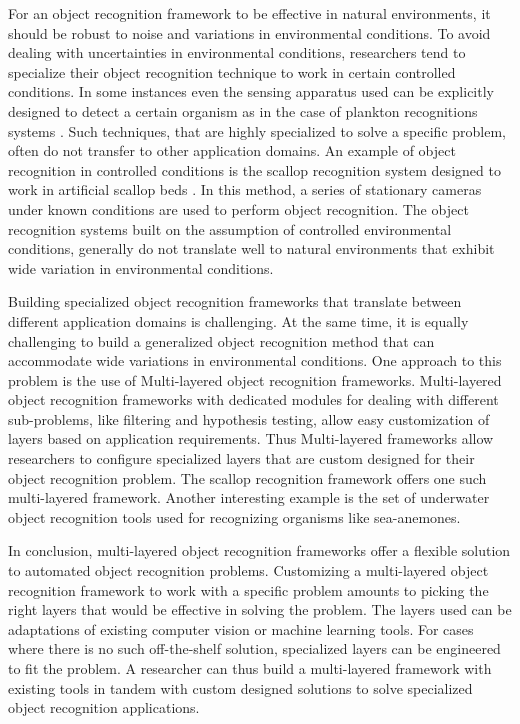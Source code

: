 \documentclass {udthesis}
\begin{document}
For an object recognition framework to be effective in natural environments, it
should be robust to noise and variations in environmental conditions. 
To avoid dealing with uncertainties in environmental conditions, researchers tend to specialize their object recognition technique to work in certain controlled conditions. In some instances even the sensing apparatus used can be explicitly designed to detect a certain organism as in the case of plankton 
recognitions systems \cite{mcgavin_plankton, stelzer_rotifier}. 
Such techniques, that are highly specialized to solve a specific problem, 
often do not transfer to other application domains. An example of object recognition in controlled conditions is the scallop recognition system designed to work in artificial scallop beds \cite{enomoto9,enomoto10}. In this method, a series of stationary cameras under known conditions are used to perform object recognition. The object recognition systems built on the assumption of controlled environmental conditions, generally do not translate well to natural environments that exhibit wide variation in environmental conditions.

Building specialized object recognition frameworks that translate between different application domains is challenging. 
At the same time, it is equally challenging to build a generalized object recognition method that can accommodate wide variations in environmental conditions. 
One approach to this problem is the use of Multi-layered object recognition frameworks. Multi-layered object recognition frameworks with dedicated modules for dealing with different sub-problems, like filtering and hypothesis testing, allow easy customization of layers based on application requirements. 
Thus Multi-layered frameworks allow researchers to configure specialized layers that are custom designed for their object recognition problem. The scallop
recognition framework \cite{prasanna_aslo, prasanna_igi} offers one such multi-layered framework. Another interesting example is the set of underwater object recognition tools \cite{schoening} used for recognizing organisms like sea-anemones.

In conclusion, multi-layered object recognition frameworks offer a flexible solution to automated object recognition problems. Customizing a multi-layered object recognition framework to work with a specific problem amounts to picking the right layers that would be effective in solving the problem. The layers used can be adaptations of existing computer vision or machine learning tools. For cases where there is no such off-the-shelf solution, specialized layers can be engineered to fit the problem. A researcher can thus build a multi-layered framework with existing tools in tandem with custom designed solutions to solve specialized object recognition applications.
\end{document}
